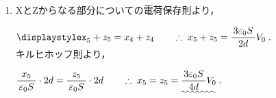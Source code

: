 \documentclass[../../../uem_phy_std_a.tex]{subfiles}
\begin{document}
\begin{enumerate}
            \myspaceb%
            $\displaystyle%
                \myfracc{x_4}{\varepsilon_0 S} \cdot 2d%
                = \myfracc{z_4}{\varepsilon_0 S} \cdot d%
                = V_0 \;.
            $

            \myspaceb%
            $\displaystyle%
                \therefore \; x_4%
                = \uwave{\myfracc{\varepsilon_0 S}{2d} V_0} \;,%
                \quad z_4 = \uwave{\myfracc{\varepsilon_0 S}{d} V_0} \;.
            $
        \item XとZからなる部分についての電荷保存則より，
            
            \myspaceb%
            $\displaystyle%
                x_5 + z_5 = x_4 + z_4%
                \qquad \therefore \; x_5 + z_5 =%
                \myfracc{3\varepsilon_0 S}{2d} V_0 \;.
            $\\
            キルヒホッフ則より，
            
            \myspaceb%
            $\displaystyle%
                \myfracc{x_5}{\varepsilon_0 S} \cdot 2d%
                = \myfracc{z_5}{\varepsilon_0 S} \cdot 2d%
                \qquad \therefore \; x_5 = z_5%
                =\uwave{\myfracc{3\varepsilon_0 S}{4d} V_0} \;.
            $
    \end{enumerate}
\end{document}
